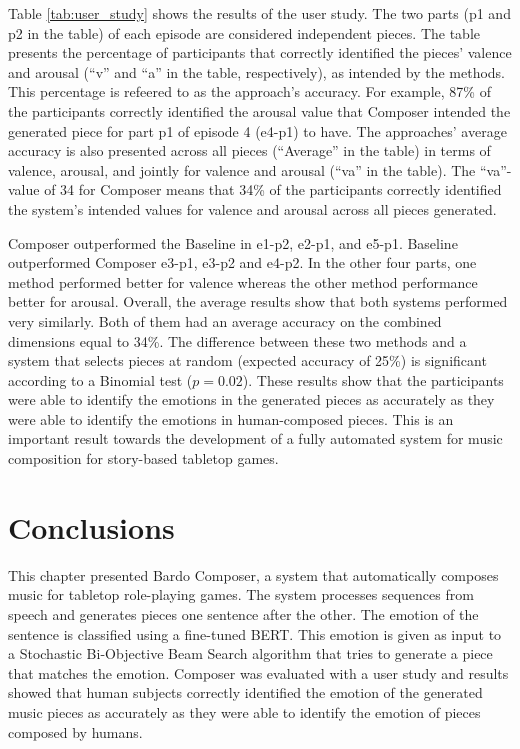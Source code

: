 Table \ref{tab:user_study} shows the results of the user study. The two parts (p1 and p2 in the table) of each episode are considered independent pieces. The table presents the percentage of participants that correctly identified the pieces' valence and arousal (``v'' and ``a'' in the table, respectively), as intended by the methods. This percentage is refeered to as the approach's accuracy. For example, 87\% of the participants correctly identified the arousal value that Composer intended the generated piece for part p1 of episode 4 (e4-p1) to have. The approaches' average accuracy is also presented across all pieces (``Average'' in the table) in terms of valence, arousal, and jointly for valence and arousal (``va'' in the table). The ``va''-value of 34 for Composer means that 34\% of the participants correctly identified the system's intended values for valence and arousal across all pieces generated.

Composer outperformed the Baseline in e1-p2, e2-p1, and e5-p1. Baseline outperformed Composer e3-p1, e3-p2 and e4-p2. In the other four parts, one method performed better for valence whereas the other method performance better for arousal. Overall, the average results show that both systems performed very similarly. Both of them had an average accuracy on the combined dimensions equal to 34\%. The difference between these two methods and a system that selects pieces at random (expected accuracy of 25\%) is significant according to a Binomial test ($p = 0.02$).
These results show that the  participants  were  able  to  identify  the  emotions  in  the generated pieces as accurately as they were able to identify the emotions in human-composed pieces. This is an important result towards the development of a fully automated system for music composition for story-based tabletop games.

\section{Conclusions}

This chapter presented Bardo Composer, a system that automatically composes music for tabletop role-playing games. The system processes sequences from speech and generates pieces one sentence after the other. The emotion of the sentence is classified using a fine-tuned BERT. This emotion is given as input to a Stochastic Bi-Objective Beam Search algorithm that tries to generate a piece that matches the emotion. Composer was evaluated with a user study and results showed that human subjects correctly identified the emotion of the generated music pieces as accurately as they were able to identify the emotion of pieces composed by humans.
